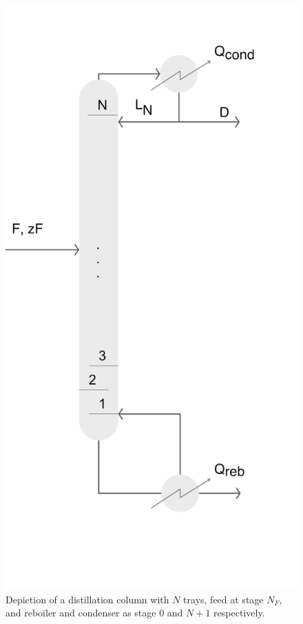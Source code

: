 \begin{figure}
    \centering
    \includegraphics{gfx/Chapter06/basic_column.png}
    \caption{Depiction of a distillation column with $N$ trays, feed at stage $N_F$, and reboiler and condenser as stage 0 and $N+1$ respectively.}
    \label{fig:column}
\end{figure}


